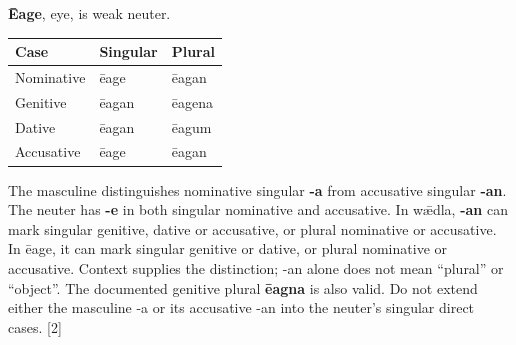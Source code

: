 \textbf{Ēage}, eye, is weak neuter.

\par\begingroup
\fontsize{10.5}{13.2}\selectfont
\setlength{\LTleft}{0pt}\setlength{\LTright}{\fill}
\noindent
\begin{tabular}{@{}>{\raggedright\arraybackslash}p{39.46mm}>{\raggedright\arraybackslash}p{39.46mm}>{\raggedright\arraybackslash}p{39.46mm}@{}}
\toprule
\textbf{Case} & \textbf{Singular} & \textbf{Plural} \\
\midrule
Nominative & ēage & ēagan \\
Genitive & ēagan & ēagena \\
Dative & ēagan & ēagum \\
Accusative & ēage & ēagan \\
\bottomrule
\end{tabular}
\par\endgroup

The masculine distinguishes nominative singular \textbf{-a} from accusative singular \textbf{-an}. The neuter has \textbf{-e} in both singular nominative and accusative. In wǣdla, \textbf{-an} can mark singular genitive, dative or accusative, or plural nominative or accusative. In ēage, it can mark singular genitive or dative, or plural nominative or accusative. Context supplies the distinction; -an alone does not mean “plural” or “object”. The documented genitive plural \textbf{ēagna} is also valid. Do not extend either the masculine -a or its accusative -an into the neuter's singular direct cases. [2]

